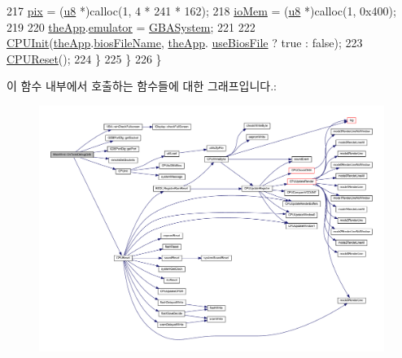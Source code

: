 \begin{DoxyCode}
217       \mbox{\hyperlink{_g_b_8cpp_a5ee6554b606dcde59ac92578b33776d0}{pix}} = (\mbox{\hyperlink{_system_8h_aed742c436da53c1080638ce6ef7d13de}{u8}} *)calloc(1, 4 * 241 * 162);
218       \mbox{\hyperlink{_globals_8cpp_a86abaf8d621ebe2fe5ed1ef5c7dd7ffd}{ioMem}} = (\mbox{\hyperlink{_system_8h_aed742c436da53c1080638ce6ef7d13de}{u8}} *)calloc(1, 0x400);
219       
220       \mbox{\hyperlink{_v_b_a_8cpp_a8095a9d06b37a7efe3723f3218ad8fb3}{theApp}}.\mbox{\hyperlink{class_v_b_a_ab40fc008c6714c3c8670eb8a9085a4a1}{emulator}} = \mbox{\hyperlink{_g_b_a_8cpp_a5affbb231a41d8d07f6e8dc9ef59789e}{GBASystem}};
221       
222       \mbox{\hyperlink{_g_b_a_8cpp_a19d66b06024f86a38f4df435e5b975fc}{CPUInit}}(\mbox{\hyperlink{_v_b_a_8cpp_a8095a9d06b37a7efe3723f3218ad8fb3}{theApp}}.\mbox{\hyperlink{class_v_b_a_a7bc70f5f75c0e2e3e2b1b63411af4559}{biosFileName}}, \mbox{\hyperlink{_v_b_a_8cpp_a8095a9d06b37a7efe3723f3218ad8fb3}{theApp}}.
      \mbox{\hyperlink{class_v_b_a_a0ad579388cd52cc4df5fadc560f27a37}{useBiosFile}} ? \textcolor{keyword}{true} : \textcolor{keyword}{false});
223       \mbox{\hyperlink{_g_b_a_8cpp_a0e28c45345553e3693144745c12aff9b}{CPUReset}}();    
224     \}
225   \}
226 \}
\end{DoxyCode}
이 함수 내부에서 호출하는 함수들에 대한 그래프입니다.\+:
\nopagebreak
\begin{figure}[H]
\begin{center}
\leavevmode
\includegraphics[width=350pt]{class_main_wnd_afd978409fe7d362576094249789ea364_cgraph}
\end{center}
\end{figure}
\mbox{\label{class_main_wnd_a9a253419b0bc7b8b246b68fcaefc1668}} 
